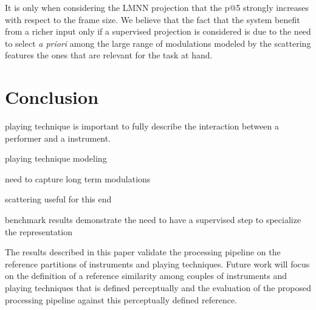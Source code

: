 \documentclass{article}
\begin{document}
It is only when considering the LMNN projection that the p@5 strongly increases with respect to the frame size. We believe that the fact that the system benefit from a richer input only if a supervised projection is considered is due to the need to select \textit{a priori} among the large range of modulations modeled by the scattering features the ones that are relevant for the task at hand.


\section{Conclusion}

playing technique is important to fully describe the interaction between a performer and a instrument.

playing technique modeling

need to capture long term modulations

scattering useful for this end

benchmark results demonstrate the need to have a supervised step to specialize the representation

The results described in this paper validate the processing pipeline on the reference partitions of instruments and playing techniques. Future work will focus on the definition of a reference similarity among couples of instruments and playing techniques that is defined perceptually and the evaluation of the proposed processing pipeline against this perceptually defined reference.




\end{document}
